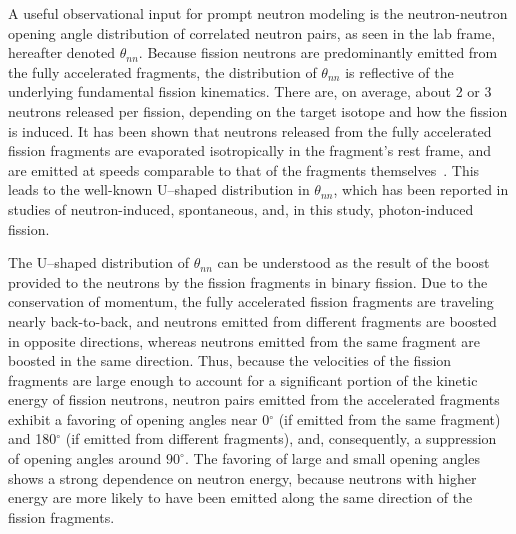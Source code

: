 A useful observational input for prompt neutron modeling is the neutron-neutron opening angle distribution of correlated neutron pairs, as seen in the lab frame, hereafter denoted $\theta_{nn}$.
Because fission neutrons are predominantly emitted from the fully accelerated fragments, the distribution of $\theta_{nn}$ is reflective of the underlying fundamental fission kinematics.
There are, on average, about 2 or 3 neutrons released per fission, depending on the target isotope and how the fission is induced.
It has been shown that neutrons released from the fully accelerated fission fragments are evaporated isotropically in the fragment's rest frame, and are emitted at speeds comparable to that of the fragments themselves~\cite{JORGENSEN}.
This leads to the well-known U--shaped distribution in $\theta_{nn}$, which has been reported in studies of neutron-induced, spontaneous, and, in this study, photon-induced fission.

The U--shaped distribution of $\theta_{nn}$ can be understood as the result of the boost provided to the neutrons by the fission fragments in binary fission.
Due to the conservation of momentum, the fully accelerated fission fragments are traveling nearly back-to-back, and neutrons emitted from different fragments are boosted in opposite directions, whereas neutrons emitted from the same fragment are boosted in the same direction.
Thus, because the velocities of the fission fragments are large enough to account for a significant portion of the kinetic energy of fission neutrons, neutron pairs emitted from the accelerated fragments exhibit a favoring of opening angles near 0$^{\circ}$ (if emitted from the same fragment) and 180$^{\circ}$ (if emitted from different fragments), and, consequently, a suppression of opening angles around $90^{\circ}$.
The favoring of large and small opening angles shows a strong dependence on neutron energy, because neutrons with higher energy are more likely to have been emitted along the same direction of the fission fragments.

